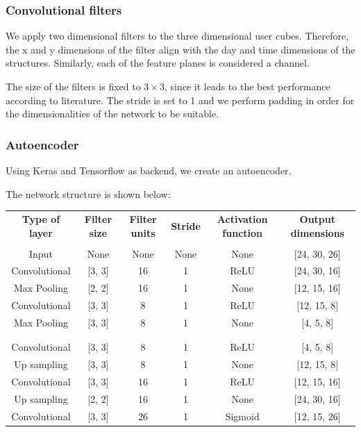 \documentclass{article}
\begin{document}
\subsubsection{Convolutional filters}
We apply two dimensional filters to the three dimensional user cubes. Therefore, the x and y dimensions of the filter align with the day and time dimensions of the structures. Similarly, each of the feature planes is considered a channel. 

The size of the filters is fixed to $3 \times 3$, since it leads to the best performance according to literature. The stride is set to 1 and we perform padding in order for the dimensionalities of the network to be suitable.


\subsubsection{Autoencoder}
Using Keras and Tensorflow as backend, we create an autoencoder. 

The network structure is shown below:

\begin{tabular}{|c|c|c|c|c|c|}
\textbf{Type of layer} & \textbf{Filter size} & \textbf{Filter units} & \textbf{Stride} & \textbf{Activation function} & \textbf{Output dimensions} \\
\\
Input & None & None & None & None  & [24, 30, 26]\\
Convolutional & [3, 3] & 16 & 1 & ReLU  & [24, 30, 16]\\
Max Pooling & [2, 2] & 16 & 1 & None  & [12, 15, 16]\\
Convolutional & [3, 3] & 8 & 1 & ReLU  & [12, 15, 8]\\
Max Pooling & [3, 3] & 8 & 1 & None  & [4, 5, 8]\\
\\\\
Convolutional & [3, 3] & 8 & 1 & ReLU  & [4, 5, 8]\\
Up sampling & [3, 3] & 8 & 1 & None  & [12, 15, 8]\\
Convolutional & [3, 3] & 16 & 1 & ReLU  & [12, 15, 16]\\
Up sampling & [2, 2] & 16 & 1 & None  & [24, 30, 16]\\
Convolutional & [3, 3] & 26 & 1 & Sigmoid  & [12, 15, 26]\\
\end{tabular}
\end{document}
